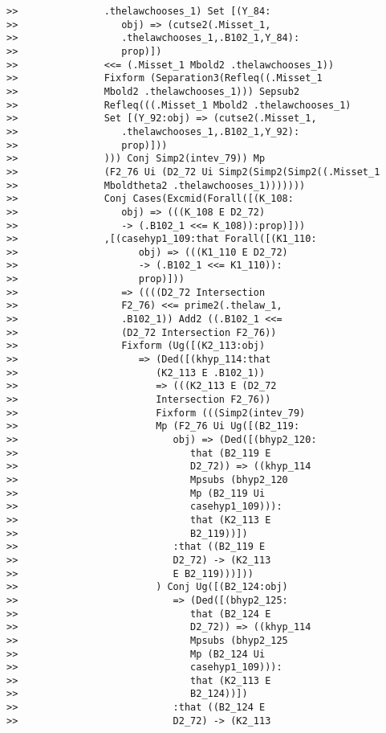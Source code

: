 \documentclass[12pt]{article}
\begin{document}
\begin{verbatim}
>>               .thelawchooses_1) Set [(Y_84:
>>                  obj) => (cutse2(.Misset_1,
>>                  .thelawchooses_1,.B102_1,Y_84):
>>                  prop)])
>>               <<= (.Misset_1 Mbold2 .thelawchooses_1))
>>               Fixform (Separation3(Refleq((.Misset_1
>>               Mbold2 .thelawchooses_1))) Sepsub2
>>               Refleq(((.Misset_1 Mbold2 .thelawchooses_1)
>>               Set [(Y_92:obj) => (cutse2(.Misset_1,
>>                  .thelawchooses_1,.B102_1,Y_92):
>>                  prop)]))
>>               ))) Conj Simp2(intev_79)) Mp
>>               (F2_76 Ui (D2_72 Ui Simp2(Simp2(Simp2((.Misset_1
>>               Mboldtheta2 .thelawchooses_1)))))))
>>               Conj Cases(Excmid(Forall([(K_108:
>>                  obj) => (((K_108 E D2_72)
>>                  -> (.B102_1 <<= K_108)):prop)]))
>>               ,[(casehyp1_109:that Forall([(K1_110:
>>                     obj) => (((K1_110 E D2_72)
>>                     -> (.B102_1 <<= K1_110)):
>>                     prop)]))
>>                  => ((((D2_72 Intersection
>>                  F2_76) <<= prime2(.thelaw_1,
>>                  .B102_1)) Add2 ((.B102_1 <<=
>>                  (D2_72 Intersection F2_76))
>>                  Fixform (Ug([(K2_113:obj)
>>                     => (Ded([(khyp_114:that
>>                        (K2_113 E .B102_1))
>>                        => (((K2_113 E (D2_72
>>                        Intersection F2_76))
>>                        Fixform (((Simp2(intev_79)
>>                        Mp (F2_76 Ui Ug([(B2_119:
>>                           obj) => (Ded([(bhyp2_120:
>>                              that (B2_119 E
>>                              D2_72)) => ((khyp_114
>>                              Mpsubs (bhyp2_120
>>                              Mp (B2_119 Ui
>>                              casehyp1_109))):
>>                              that (K2_113 E
>>                              B2_119))])
>>                           :that ((B2_119 E
>>                           D2_72) -> (K2_113
>>                           E B2_119)))]))
>>                        ) Conj Ug([(B2_124:obj)
>>                           => (Ded([(bhyp2_125:
>>                              that (B2_124 E
>>                              D2_72)) => ((khyp_114
>>                              Mpsubs (bhyp2_125
>>                              Mp (B2_124 Ui
>>                              casehyp1_109))):
>>                              that (K2_113 E
>>                              B2_124))])
>>                           :that ((B2_124 E
>>                           D2_72) -> (K2_113

\end{verbatim}
\end{document}
